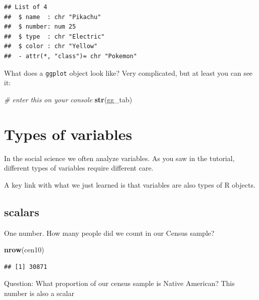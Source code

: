 \documentclass[
]{book}
\newenvironment{Shaded}{\begin{snugshade}}{\end{snugshade}}
\newcommand{\CommentTok}[1]{\textcolor[rgb]{0.56,0.35,0.01}{\textit{#1}}}
\newcommand{\KeywordTok}[1]{\textcolor[rgb]{0.13,0.29,0.53}{\textbf{#1}}}
\newcommand{\NormalTok}[1]{#1}
\newcommand{\OperatorTok}[1]{\textcolor[rgb]{0.81,0.36,0.00}{\textbf{#1}}}
\theoremstyle{definition}
\theoremstyle{definition}
\theoremstyle{definition}
\theoremstyle{remark}
\begin{document}
\begin{verbatim}
## List of 4
##  $ name  : chr "Pikachu"
##  $ number: num 25
##  $ type  : chr "Electric"
##  $ color : chr "Yellow"
##  - attr(*, "class")= chr "Pokemon"
\end{verbatim}

What does a \texttt{ggplot} object look like? Very complicated, but at least you can see it:

\begin{Shaded}
\begin{Highlighting}[]
\CommentTok{\# enter this on your console}
\KeywordTok{str}\NormalTok{(gg\_tab)}
\end{Highlighting}
\end{Shaded}

\hypertarget{types-of-variables}{%
\section{Types of variables}\label{types-of-variables}}

In the social science we often analyze variables. As you saw in the tutorial, different types of variables require different care.

A key link with what we just learned is that variables are also types of R objects.

\hypertarget{scalars}{%
\subsection{scalars}\label{scalars}}

One number. How many people did we count in our Census sample?

\begin{Shaded}
\begin{Highlighting}[]
\KeywordTok{nrow}\NormalTok{(cen10)}
\end{Highlighting}
\end{Shaded}

\begin{verbatim}
## [1] 30871
\end{verbatim}

Question: What proportion of our census sample is Native American? This number is also a scalar

\begin{Shaded}
\end{Shaded}
\end{document}
